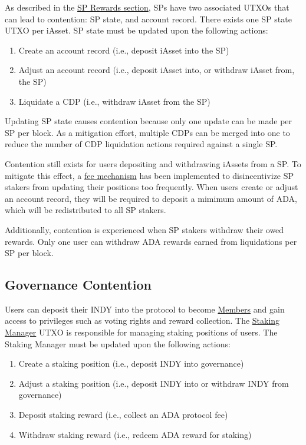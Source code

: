 \documentclass{article}
\begin{document}
\begin{sloppypar}
As described in the
\protect\hyperlink{stability-pool-liquidation-rewards}{SP Rewards
section}, SPs have two associated UTXOs that can lead to contention: SP
state, and account record. There exists one SP state UTXO per iAsset. SP
state must be updated upon the following actions:

\begin{enumerate}
\item
  Create an account record (i.e., deposit iAsset into the SP)
\item
  Adjust an account record (i.e., deposit iAsset into, or withdraw
  iAsset from, the SP)
\item
  Liquidate a CDP (i.e., withdraw iAsset from the SP)
\end{enumerate}

Updating SP state causes contention because only one update can be made
per SP per block. As a mitigation effort, multiple CDPs can be merged
into one to reduce the number of CDP liquidation actions required
against a single SP.

Contention still exists for users depositing and withdrawing iAssets
from a SP. To mitigate this effect, a
\protect\hyperlink{stability-pool-staking-fees}{fee mechanism} has been
implemented to disincentivize SP stakers from updating their positions
too frequently. When users create or adjust an account record, they will
be required to deposit a mimimum amount of ADA, which will be
redistributed to all SP stakers.

Additionally, contention is experienced when SP stakers withdraw their
owed rewards. Only one user can withdraw ADA rewards earned from
liquidations per SP per block.

\hypertarget{governance-contention}{%
\subsection{Governance Contention}\label{governance-contention}}

Users can deposit their INDY into the protocol to become
\protect\hyperlink{staking}{Members} and gain access to privileges such
as voting rights and reward collection. The
\protect\hyperlink{staking}{Staking Manager} UTXO is responsible for
managing staking positions of users. The Staking Manager must be updated
upon the following actions:

\begin{enumerate}
\item
  Create a staking position (i.e., deposit INDY into governance)
\item
  Adjust a staking position (i.e., deposit INDY into or withdraw INDY
  from governance)
\item
  Deposit staking reward (i.e., collect an ADA protocol fee)
\item
  Withdraw staking reward (i.e., redeem ADA reward for staking)
\end{enumerate}


\end{sloppypar}
\end{document}
